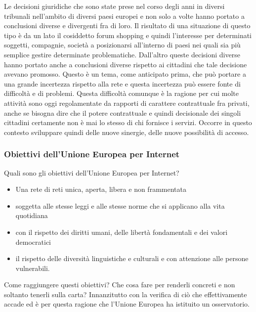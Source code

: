         Le decisioni giuridiche che sono state prese nel corso degli anni in diversi tribunali nell'ambito di diversi paesi europei e non solo a volte hanno portato a conclusioni diverse e divergenti fra di loro. Il risultato di una situazione di questo tipo è da un lato il cosiddetto forum shopping e quindi l'interesse per determinati soggetti, compagnie, società a posizionarsi all'interno di paesi nei quali sia più semplice gestire determinate problematiche. Dall'altro queste decisioni diverse hanno portato anche a conclusioni diverse rispetto ai cittadini che tale decisione avevano promosso. Questo è un tema, come anticipato prima, che può portare a una grande incertezza rispetto alla rete e questa incertezza può essere fonte di difficoltà e di problemi. Questa difficoltà comunque è la ragione per cui molte attività sono oggi regolamentate da rapporti di carattere contrattuale fra privati, anche se bisogna dire che il potere contrattuale e quindi decisionale dei singoli cittadini certamente non è mai lo stesso di chi fornisce i servizi. Occorre in questo contesto sviluppare quindi delle nuove sinergie, delle nuove possibilità di accesso. 

        \subsubsection{Obiettivi dell'Unione Europea per Internet}
        Quali sono gli obiettivi dell'Unione Europea per Internet? 
        
        \begin{itemize}
            \item Una rete di reti unica, aperta, libera e non frammentata
            \item soggetta alle stesse leggi e alle stesse norme che si applicano alla vita quotidiana
            \item con il rispetto dei diritti umani, delle libertà fondamentali e dei valori democratici 
            \item il rispetto delle diversità linguistiche e culturali e con attenzione alle persone vulnerabili.
        \end{itemize}  
        Come raggiungere questi obiettivi? Che cosa fare per renderli concreti e non soltanto tenerli sulla carta? Innanzitutto con la verifica di ciò che effettivamente accade ed è per questa ragione che l'Unione Europea ha istituito un osservatorio. 

